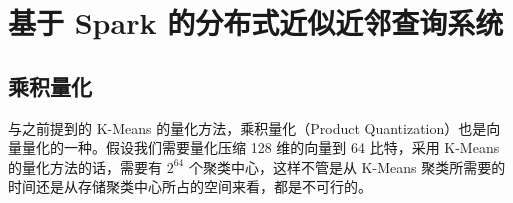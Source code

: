 

\chapter{基于 Spark 的分布式近似近邻查询系统}
\label{cha:ANNS_based_on_Spark}
\section{乘积量化}
\label{sec:product_quantization}
与之前提到的 K-Means 的量化方法，乘积量化（Product Quantization）\cite{Herve_PQ}也是向量量化的一种。假设我们需要量化压缩 128 维的向量到 64 比特，采用 K-Means 的量化方法的话，需要有 $2^{64}$ 个聚类中心，这样不管是从 K-Means 聚类所需要的时间还是从存储聚类中心所占的空间来看，都是不可行的。

